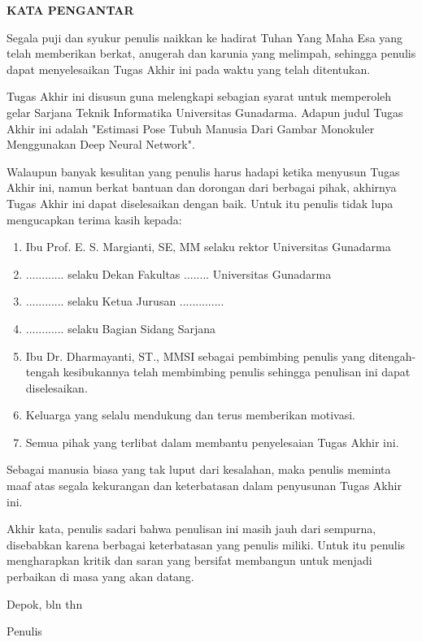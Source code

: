 \newpage %
\begin{center}
\begin{large}\textbf{KATA PENGANTAR}\\\end{large}
\end{center}
\vspace{5mm}


Segala puji dan syukur penulis naikkan ke hadirat Tuhan Yang Maha Esa yang telah memberikan berkat, 
anugerah dan karunia yang melimpah, sehingga penulis dapat menyelesaikan Tugas Akhir ini pada waktu 
yang telah ditentukan.

Tugas Akhir ini disusun guna melengkapi sebagian syarat untuk memperoleh gelar Sarjana Teknik 
Informatika Universitas Gunadarma. Adapun judul Tugas Akhir ini adalah "Estimasi Pose Tubuh Manusia 
Dari Gambar Monokuler Menggunakan Deep Neural Network".

Walaupun banyak kesulitan yang penulis harus hadapi ketika menyusun Tugas Akhir ini, namun berkat 
bantuan dan dorongan dari berbagai pihak, akhirnya Tugas Akhir ini dapat diselesaikan dengan baik. 
Untuk itu penulis tidak lupa mengucapkan terima kasih kepada:

\begin{enumerate}
  \item Ibu Prof. E. S. Margianti, SE, MM selaku rektor Universitas Gunadarma
  \item ............ selaku Dekan Fakultas ........ Universitas Gunadarma
  \item ............ selaku Ketua Jurusan ..............
  \item ............ selaku Bagian Sidang Sarjana
  \item Ibu Dr. Dharmayanti, ST., MMSI sebagai pembimbing penulis yang ditengah-tengah kesibukannya 
  telah membimbing penulis sehingga penulisan ini dapat diselesaikan.
  \item Keluarga yang selalu mendukung dan terus memberikan motivasi.
  \item Semua pihak yang terlibat dalam membantu penyelesaian Tugas Akhir ini.

\end{enumerate}

Sebagai manusia biasa yang tak luput dari kesalahan, maka penulis meminta maaf atas segala kekurangan dan keterbatasan dalam penyusunan Tugas Akhir ini.

Akhir kata, penulis sadari bahwa penulisan ini masih jauh dari sempurna, disebabkan karena berbagai keterbatasan yang penulis miliki. Untuk itu penulis mengharapkan kritik dan saran yang bersifat membangun untuk menjadi perbaikan di masa yang akan datang.


\vspace{0.5 cm}
\begin{flushright}
Depok, bln thn

\vspace{1.5 cm}
Penulis
\end{flushright}